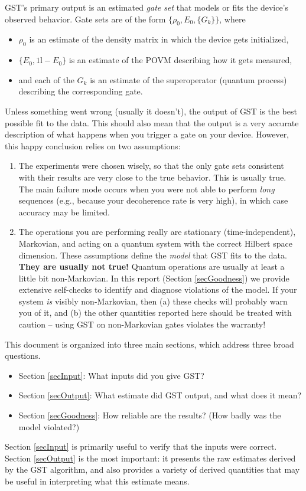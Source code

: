 \documentclass{article}[11pt]
\def\Id{1\!\mathrm{l}}
\begin{document}
GST's primary output is an estimated \emph{gate set} that models or fits the device's observed behavior.  Gate sets are of the form $\{\rho_0,E_0,\{G_k\}\}$, where
\begin{itemize}
\item $\rho_0$ is an estimate of the density matrix in which the device gets initialized,
\item $\{E_0,\Id-E_0\}$ is an estimate of the POVM describing how it gets measured,
\item and each of the $G_k$ is an estimate of the superoperator (quantum process) describing the corresponding gate.
\end{itemize}
Unless something went wrong (usually it doesn't), the output of GST is the best possible fit to the data.  This should also mean that the output is a very accurate description of what happens when you trigger a gate on your device.  However, this happy conclusion relies on two assumptions:
\begin{enumerate}
\item The experiments were chosen wisely, so that the only gate sets consistent with their results are very close to the true behavior.  This is usually true.  The main failure mode occurs when you were not able to perform \emph{long} sequences (e.g., because your decoherence rate is very high), in which case accuracy may be limited. 
\item The operations you are performing really are stationary (time-independent), Markovian, and acting on a quantum system with the correct Hilbert space dimension.  These assumptions define the \emph{model} that GST fits to the data.  \textbf{They are usually not true!}  Quantum operations are usually at least a little bit non-Markovian.  In this report (Section \ref{secGoodness}) we provide extensive self-checks to identify and diagnose violations of the model.  If your system \emph{is} visibly non-Markovian, then (a) these checks will probably warn you of it, and (b) the other quantities reported here should be treated with caution -- using GST on non-Markovian gates violates the warranty!
\end{enumerate}

This document is organized into three main sections, which address three broad questions.
\begin{itemize}
\item Section \ref{secInput}:  What inputs did you give GST?
\item Section \ref{secOutput}:  What estimate did GST output, and what does it mean?
\item Section \ref{secGoodness}:  How reliable are the results? (How badly was the model violated?)
\end{itemize}
Section \ref{secInput} is primarily useful to verify that the inputs were correct.  Section \ref{secOutput} is the most important:  it presents the raw estimates derived by the GST algorithm, and also provides a variety of derived quantities that may be useful in interpreting what this estimate means.
\end{document}
